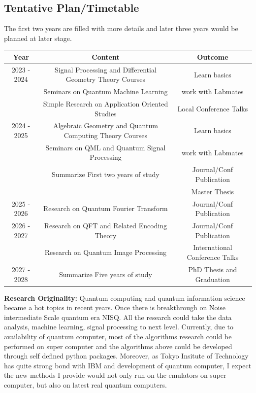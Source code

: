 \documentclass{article}
\begin{document}
\subsection{Tentative Plan/Timetable}
The first two years are filled with more details 
and later three years would be planned at later stage. 

\begin{center}
  \begin{tabular}{c|c|c}
    Year & Content & Outcome \\
    \hline
    2023 - 2024 &  Signal Processing and Differential Geometry Theory Courses& Learn basics \\
                &  Seminars on Quantum Machine Learning &  work with Labmates \\
                &  Simple Research on Application Oriented Studies & Local Conference Talks \\ 
    2024 - 2025 &  Algebraic Geometry and Quantum Computing Theory Courses & Learn basics \\
                &  Seminars on QML and Quantum Signal Processing  & work with Labmates \\
                &  Summarize First two years of study & Journal/Conf Publication \\
                & & Master Thesis \\
    \hline
    2025 - 2026 &  Research on Quantum Fourier Transform  & Journal/Conf Publication\\
    2026 - 2027 &  Research on QFT and Related Encoding Theory  & Journal/Conf Publication \\
    & Research on Quantum Image Processing & International Conference Talks \\
    2027 - 2028 &  Summarize Five years of study & PhD Thesis and Graduation 
  \end{tabular}
\end{center}

\textbf{Research Originality:}
Quantum computing and quantum information science became a hot topics in 
recent years. \cite{qml_hep}
Once there is breakthrough on Noise intermediate Scale quantum era NISQ. All 
the research could take the data analysis, machine learning, signal processing 
to next level. Currently, due to availability of quantum computer, most of the 
algorithms research could be performed on super computer and the algorithms 
above could be developed through self defined python packages. 
Moreover, as Tokyo Insitute of Technology has quite strong bond with 
IBM and development of quantum computer, I expect the new methods I provide 
would not only run on the emulators on super computer, but also on latest real 
quantum computers. 
\end{document}
